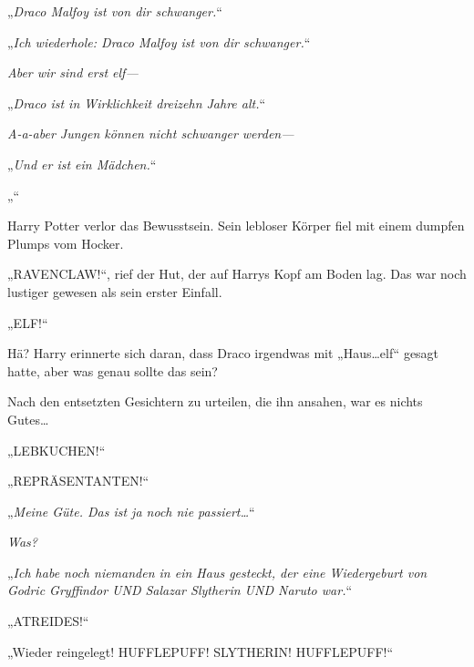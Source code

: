 \emph{}

„\emph{Draco Malfoy ist von dir schwanger.}“

\emph{}

„\emph{Ich wiederhole: Draco Malfoy ist von dir schwanger.}“

\emph{Aber wir sind erst elf—}

„\emph{Draco ist in Wirklichkeit dreizehn Jahre alt.}“

\emph{A-a-aber Jungen können nicht schwanger werden—}

„\emph{Und er ist ein Mädchen.}“

\emph{}

„\emph{}“

Harry Potter verlor das Bewusstsein. Sein lebloser Körper fiel mit einem dumpfen Plumps vom Hocker.

„RAVENCLAW!“, rief der Hut, der auf Harrys Kopf am Boden lag. Das war noch lustiger gewesen als sein erster Einfall.

\later

„ELF!“

Hä? Harry erinnerte sich daran, dass Draco irgendwas mit „Haus…elf“ gesagt hatte, aber was genau sollte das sein?

Nach den entsetzten Gesichtern zu urteilen, die ihn ansahen, war es nichts Gutes…

\later

„LEBKUCHEN!“%

\later

„REPRÄSENTANTEN!“

\later

„\emph{Meine Güte. Das ist ja noch nie passiert…}“

\emph{Was?}

„\emph{Ich habe noch niemanden in ein Haus gesteckt, der eine Wiedergeburt von Godric Gryffindor UND Salazar Slytherin UND Naruto war.}“

\later

„ATREIDES!“%

\later

„Wieder reingelegt! HUFFLEPUFF! SLYTHERIN! HUFFLEPUFF!“

